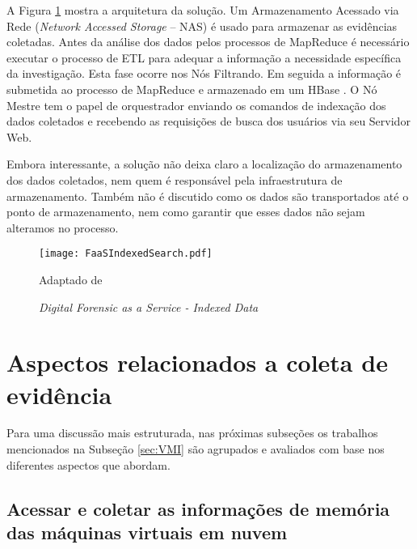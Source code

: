 A Figura \ref{fig:FaaSIndexedSearch} mostra a arquitetura da solução. Um Armazenamento Acessado via Rede (\textit{Network Accessed Storage} -- NAS) é usado para armazenar as evidências coletadas.
%
Antes da análise dos dados pelos processos de MapReduce é necessário executar o processo de ETL para adequar a informação a necessidade específica da investigação. Esta fase ocorre nos Nós Filtrando.
%
Em seguida a informação é submetida ao processo de MapReduce e armazenado em um HBase \cite{Hbase2018}.
%
O Nó Mestre tem o papel de orquestrador enviando os comandos de indexação dos dados coletados e recebendo as requisições de busca dos usuários via seu Servidor Web.


Embora interessante, a solução não deixa claro a localização do armazenamento dos dados coletados, nem quem é responsável pela infraestrutura de armazenamento.
%
Também não é discutido como os dados são transportados até o ponto de armazenamento, nem como garantir que esses dados não sejam alteramos no processo.
%


\begin{figure}[htb!]
\footnotesize
\caption{\textit{Digital Forensic as a Service - Indexed Data}}
\texttt{[image: FaaSIndexedSearch.pdf]}
\centering
\label{fig:FaaSIndexedSearch}
\begin{center}
Adaptado de \cite{FaaSIndexedSearch:2012} 
\end{center}
\end{figure}


\section{Aspectos relacionados a coleta de evidência}
\label{sec:coletadeevidencia}

Para uma discussão mais estruturada, nas próximas subseções os trabalhos mencionados na Subseção \ref{sec:VMI} são agrupados e avaliados com base nos diferentes aspectos que abordam.

\subsection{Acessar e coletar as informações de memória das máquinas virtuais em nuvem}
\label{sec:coletadeevidencia}

